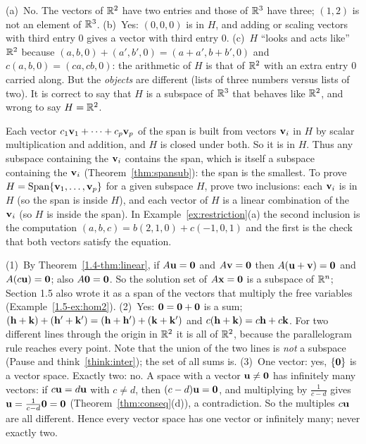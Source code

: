 \documentclass[11pt]{article}
\begin{document}
\begin{description}[leftmargin=0pt,itemsep=5pt]
  \item[Pause and think \ref{think:r2r3}.] (a)~No. The vectors of $\mathbb{R}^2$ have two entries and those of $\mathbb{R}^3$ have three; $(1,2)$ is not an element of $\mathbb{R}^3$. (b)~Yes: $(0,0,0)$ is in $H$, and adding or scaling vectors with third entry $0$ gives a vector with third entry $0$. (c)~$H$ ``looks and acts like'' $\mathbb{R}^2$ because $(a,b,0)+(a',b',0)=(a+a',b+b',0)$ and $c(a,b,0)=(ca,cb,0)$: the arithmetic of $H$ is that of $\mathbb{R}^2$ with an extra entry $0$ carried along. But the \emph{objects} are different (lists of three numbers versus lists of two). It is correct to say that $H$ is a subspace of $\mathbb{R}^3$ that behaves like $\mathbb{R}^2$, and wrong to say $H=\mathbb{R}^2$.
  \item[Pause and think \ref{think:smallest}.] Each vector $c_1\mathbf{v}_1+\cdots+c_p\mathbf{v}_p$ of the span is built from vectors $\mathbf{v}_i$ in $H$ by scalar multiplication and addition, and $H$ is closed under both. So it is in $H$. Thus any subspace containing the $\mathbf{v}_i$ contains the span, which is itself a subspace containing the $\mathbf{v}_i$ (Theorem~\ref{thm:spansub}): the span is the smallest. To prove $H=\operatorname{Span}\{\mathbf{v}_1,\dots,\mathbf{v}_p\}$ for a given subspace $H$, prove two inclusions: each $\mathbf{v}_i$ is in $H$ (so the span is inside $H$), and each vector of $H$ is a linear combination of the $\mathbf{v}_i$ (so $H$ is inside the span). In Example~\ref{ex:restriction}(a) the second inclusion is the computation $(a,b,c)=b(2,1,0)+c(-1,0,1)$ and the first is the check that both vectors satisfy the equation.
  \item[Before the next section.] (1)~By Theorem~\ref{1.4-thm:linear}, if $A\mathbf{u}=\mathbf{0}$ and $A\mathbf{v}=\mathbf{0}$ then $A(\mathbf{u}+\mathbf{v})=\mathbf{0}$ and $A(c\mathbf{u})=\mathbf{0}$; also $A\mathbf{0}=\mathbf{0}$. So the solution set of $A\mathbf{x}=\mathbf{0}$ is a subspace of $\mathbb{R}^n$; Section 1.5 also wrote it as a span of the vectors that multiply the free variables (Example~\ref{1.5-ex:hom2}). (2)~Yes: $\mathbf{0}=\mathbf{0}+\mathbf{0}$ is a sum; $(\mathbf{h}+\mathbf{k})+(\mathbf{h}'+\mathbf{k}')=(\mathbf{h}+\mathbf{h}')+(\mathbf{k}+\mathbf{k}')$ and $c(\mathbf{h}+\mathbf{k})=c\mathbf{h}+c\mathbf{k}$. For two different lines through the origin in $\mathbb{R}^2$ it is all of $\mathbb{R}^2$, because the parallelogram rule reaches every point. Note that the union of the two lines is \emph{not} a subspace (Pause and think~\ref{think:inter}); the set of all sums is. (3)~One vector: yes, $\{\mathbf{0}\}$ is a vector space. Exactly two: no. A space with a vector $\mathbf{u}\neq\mathbf{0}$ has infinitely many vectors: if $c\mathbf{u}=d\mathbf{u}$ with $c\neq d$, then $(c-d)\mathbf{u}=\mathbf{0}$, and multiplying by $\tfrac1{c-d}$ gives $\mathbf{u}=\tfrac1{c-d}\mathbf{0}=\mathbf{0}$ (Theorem~\ref{thm:conseq}(d)), a contradiction. So the multiples $c\mathbf{u}$ are all different. Hence every vector space has one vector or infinitely many; never exactly two.
\end{description}
\end{document}
